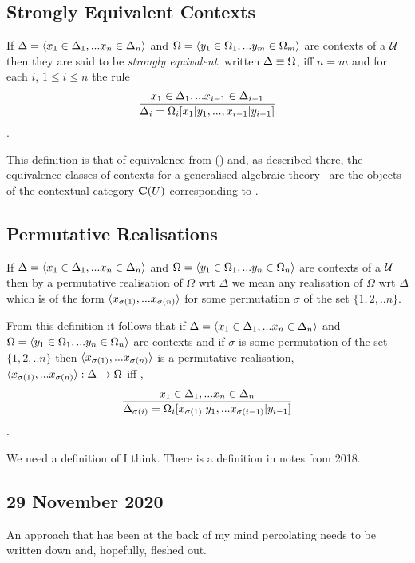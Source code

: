 \documentclass[10pt,a4paper]{scrartcl}
\begin{document}
\subsection{Strongly Equivalent Contexts}
\begin{definition}
If  $\Delta= \langle x_1 \in \Delta_1,... x_{n} \in \Delta_{n}\rangle$ 
and $\Omega = \langle y_1 \in \Omega_1,... y_{m} \in \Omega_{m}\rangle$ are contexts of a \GAT $\mathcal{U}$ then they are said to be \textit{strongly equivalent}, written $\Delta \equiv \Omega$,  iff $n=m$ and for each $i$, $1 \leq i \leq n$ the rule 
$$
\frac{x_1 \in \Delta_1,... x_{i-1} \in \Delta_{i-1}}{\Delta_i=\Omega_i[x_1|y_1,...,x_{i-1}|y_{i-1}]}
$$
\intheory.
\end{definition}

This definition is that of equivalence from (\cite{Cartmell78})  and, as described there, the  equivalence classes of contexts for a generalised algebraic theory \gat\  are the objects of the contextual category $\mathbf{C}(U)$ corresponding to \gat.

\subsection{Permutative Realisations}
\begin{definition}
If $\Delta=\langle x_1 \in \Delta_1,... x_{n} \in \Delta_{n}\rangle$ and $\Omega = \langle y_1 \in \Omega_1,... y_{n} \in \Omega_{n}\rangle$ are contexts of a \GAT $\mathcal{U}$ then by a permutative realisation of $\Omega$ wrt $\Delta$ we mean any
realisation of $\Omega$ wrt $\Delta$ which is of the form $\langle x_{\sigma(1)},...x_{\sigma(n)}\rangle$ for some permutation $\sigma$ of the set $\{1,2,..n\}$.
\end{definition}

\begin{observation}
From this definition it follows that if $\Delta=\langle x_1 \in \Delta_1,... x_{n} \in \Delta_{n}\rangle$ and $\Omega = \langle y_1 \in \Omega_1,... y_{n} \in \Omega_{n}\rangle$ are contexts and if $\sigma$ is some permutation of the set $\{1,2,..n\}$
then $\langle x_{\sigma(1)},...x_{\sigma(n)}\rangle$ is a permutative realisation, $\langle x_{\sigma(1)},...x_{\sigma(n)}\rangle: \Delta \rightarrow \Omega$ iff \foreachi, 
\begin{equation*}
\frac{x_1 \in \Delta_1,... x_{n} \in \Delta_{n}}{\Delta_{\sigma(i)}=\Omega_i[x_{\sigma(1)}|y_1,...x_{\sigma(i-1)}|y_{i-1}]}
\end{equation*}
\intheory.
\end{observation}

We need a definition of  I think. There is a definition in notes from 2018.

\subsection{29 November 2020}
An approach that has been at the back of my mind percolating needs to be written down and, hopefully, fleshed out.
\end{document}
